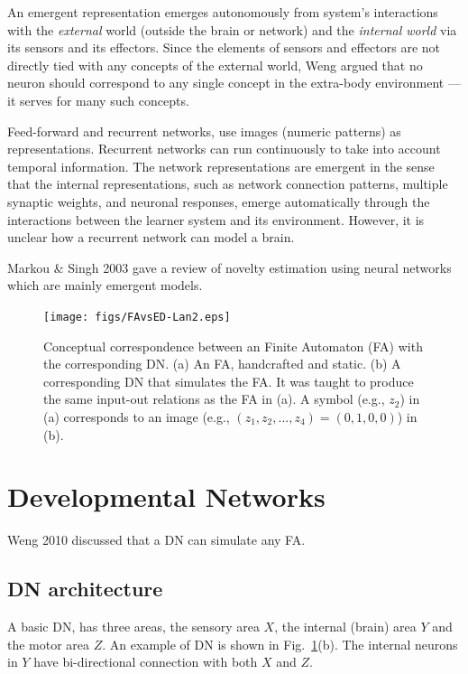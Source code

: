 \documentclass[conference]{IEEEtran}
\begin{document}
An emergent representation emerges autonomously from system's  interactions with the {\em external} world (outside the brain or network) and
the {\em internal world} via its sensors and
its effectors.  Since the elements of sensors and effectors are not directly tied with any 
concepts of the external world, Weng  \cite{WengRepRev12} argued that no neuron 
should correspond to any single concept in the extra-body environment --- it serves for many such concepts.

Feed-forward \cite{Serre07,Rogers08} and recurrent \cite{Hinton06,Yamashita08} networks, use 
images (numeric patterns) as representations.    Recurrent networks can run continuously to take into account temporal information.  The network representations are emergent in the sense that the internal
representations, such as network connection patterns, multiple synaptic weights, and neuronal responses, emerge automatically 
through the interactions between the learner system and its environment.   
However, it is unclear how a recurrent network can model a brain.  

Markou \& Singh 2003 \cite{Markou03} gave a review of novelty estimation using neural networks which are mainly emergent models. 

\begin{figure}[tb]
     \centering
      \texttt{[image: figs/FAvsED-Lan2.eps]}
\caption{\protect\small  Conceptual correspondence between an Finite Automaton (FA) with the
corresponding DN.   (a) An FA, handcrafted and static.  
(b)  A corresponding DN that simulates the FA. 
 It was taught to produce the same input-out relations as the FA in (a).
A symbol (e.g., $z_2$) in (a) corresponds to an image (e.g., $(z_1, z_2, ... , z_4) = (0, 1, 0, 0)$) in (b).
}
 \label{FG:FAvsED}
\end{figure} 

\section{Developmental Networks}
\label{SE:DN}
Weng 2010 \cite{WengIJCNN10} discussed that
a DN can simulate any FA.   

\subsection{DN architecture}

A basic DN, has three areas, the sensory area $X$, the internal (brain) area $Y$ and the motor area $Z$.
An example of DN is shown in Fig.~\ref{FG:FAvsED}(b).   
The internal neurons in $Y$ have bi-directional connection with both $X$ and $Z$.  
\end{document}
